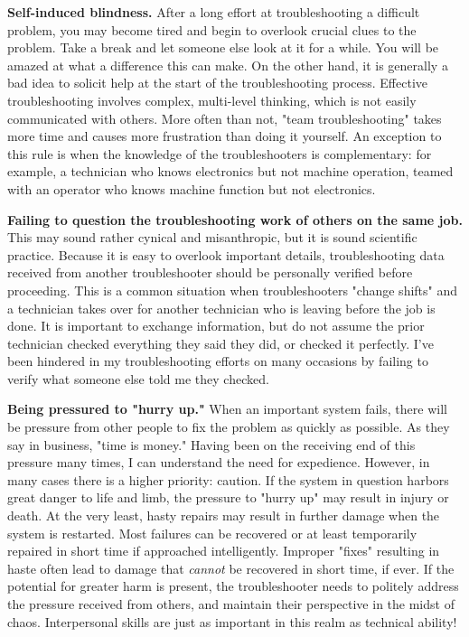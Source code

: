 {\bf Self-induced blindness.} After a long effort at troubleshooting a
difficult problem, you may become tired and begin to overlook crucial
clues to the problem. Take a break and let someone else look at it for a
while. You will be amazed at what a difference this can make. On the
other hand, it is generally a bad idea to solicit help at the start of
the troubleshooting process. Effective troubleshooting involves complex,
multi-level thinking, which is not easily communicated with others. More
often than not, "team troubleshooting" takes more time and causes more
frustration than doing it yourself. An exception to this rule is when
the knowledge of the troubleshooters is complementary: for example, a
technician who knows electronics but not machine operation, teamed with
an operator who knows machine function but not electronics.

{\bf Failing to question the troubleshooting work of others on the same
job.} This may sound rather cynical and misanthropic, but it is sound
scientific practice. Because it is easy to overlook important details,
troubleshooting data received from another troubleshooter should be
personally verified before proceeding. This is a common situation when
troubleshooters "change shifts" and a technician takes over for another
technician who is leaving before the job is done. It is important to
exchange information, but do not assume the prior technician checked
everything they said they did, or checked it perfectly. I've been
hindered in my troubleshooting efforts on many occasions by failing to
verify what someone else told me they checked.

{\bf Being pressured to "hurry up."} When an important system fails,
there will be pressure from other people to fix the problem as quickly
as possible. As they say in business, "time is money." Having been on
the receiving end of this pressure many times, I can understand the need
for expedience. However, in many cases there is a higher priority:
caution. If the system in question harbors great danger to life and
limb, the pressure to "hurry up" may result in injury or death. At the
very least, hasty repairs may result in further damage when the system
is restarted. Most failures can be recovered or at least temporarily
repaired in short time if approached intelligently. Improper "fixes"
resulting in haste often lead to damage that {\em cannot} be recovered
in short time, if ever. If the potential for greater harm is present,
the troubleshooter needs to politely address the pressure received from
others, and maintain their perspective in the midst of chaos.
Interpersonal skills are just as important in this realm as technical
ability!

